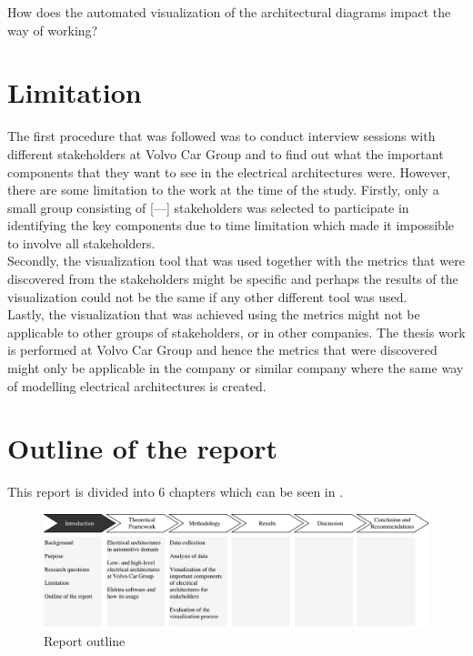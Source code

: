 \begin{que} \label{que:6}
How does the automated visualization of the architectural diagrams impact the way of working?
\end{que}


\section{Limitation} \label{Limitation_ref}
The first procedure that was followed was to conduct interview sessions with different stakeholders at Volvo Car Group and to find out what the important components that they want to see in the electrical architectures were. However, there are some limitation to the work at the time of the study. Firstly, only a small group consisting of [---] stakeholders was selected to participate in identifying the key components due to time limitation which made it impossible to involve all stakeholders. \\

Secondly, the visualization tool that was used together with the metrics that were discovered from the stakeholders might be specific and perhaps the results of the visualization could not be the same if any other different tool was used. \\

Lastly, the visualization that was achieved using the metrics might not be applicable to other groups of stakeholders, or in other companies. The thesis work is performed at Volvo Car Group and hence the metrics that were discovered might only be applicable in the company or similar company where the same way of modelling electrical architectures is created.


\section{Outline of the report} \label{Outline_ref}
This report is divided into 6 chapters which can be seen in . 
\begin{figure}[H]
\centering
\captionsetup{justification=centering}
\vspace{0cm}%
\includegraphics[width=1\linewidth]{figure/report_outline.pdf}
\caption{Report outline}
\end{figure}